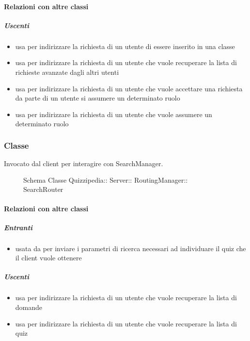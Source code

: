 \paragraph{Relazioni con altre classi}
\subparagraph{Uscenti}
\begin{itemize}
\item usa  per indirizzare la richiesta di un utente di essere inserito in una classe
\item usa  per indirizzare la richiesta di un utente che vuole recuperare la lista di richieste avanzate dagli altri utenti
\item usa  per indirizzare la richiesta di un utente che vuole accettare una richiesta da parte di un utente si assumere un determinato ruolo
\item usa  per indirizzare la richiesta di un utente che vuole assumere un determinato ruolo
\end{itemize}
\subsubsection{Classe }
Invocato dal client per interagire con SearchManager.
\begin{figure}[H]
\centering
\noindent{}
\caption[Schema Classe SearchRouter]{Schema Classe Quizzipedia:: Server:: RoutingManager:: SearchRouter}
\end{figure}
\paragraph{Relazioni con altre classi}
\subparagraph{Entranti}
\begin{itemize}
\item usata da  per inviare i parametri di ricerca necessari ad individuare il quiz che il client vuole ottenere
\end{itemize}
\subparagraph{Uscenti}
\begin{itemize}
\item usa  per indirizzare la richiesta di un utente che vuole recuperare la lista di domande
\item usa  per indirizzare la richiesta di un utente che vuole recuperare la lista di quiz
\end{itemize}
